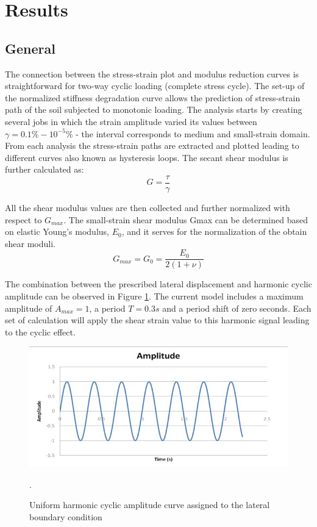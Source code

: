 \documentclass[12pt,a4paper]{report}
\begin{document}
\newpage
\section{Results}
\subsection{General}
The connection between the stress-strain plot and modulus reduction curves is straightforward for two-way cyclic loading (complete stress cycle). The set-up of the normalized stiffness degradation curve allows the prediction of stress-strain path of the soil subjected to monotonic loading. 
The analysis starts by creating several jobs in which the strain amplitude varied its values between $\gamma=0.1\%-10^{-5}\%$ - the interval corresponds to medium and small-strain domain. From each analysis the stress-strain paths are extracted and plotted leading to different curves also known as hysteresis loops. The secant shear modulus is further calculated as:
\begin{equation}
	G=\frac{\tau}{\gamma}
\end{equation}

All the shear modulus values are then collected and further normalized with respect to $G_{max}$. The small-strain shear modulus Gmax can be determined based on elastic Young's modulus, $E_0$, and it serves for the normalization of the obtain shear moduli. 
\begin{equation}
	G_{max} = G_0=\frac{E_0}{2(1+\nu)}
\end{equation}

The combination between the prescribed lateral displacement and harmonic cyclic amplitude can be observed in Figure \ref{cyclic}. The current model includes a maximum amplitude of $A_{max} = 1$, a period $T=0.3s$ and a period shift of zero seconds. Each set of calculation will apply the shear strain value to this harmonic signal leading to the cyclic effect.

\begin{figure}[h!]
	\centering
	\includegraphics[width=0.7\linewidth]{"cyclicampl"}
	\caption{Uniform harmonic cyclic amplitude curve assigned to the lateral boundary condition}
	\label{cyclic}.
\end{figure}
\end{document}
